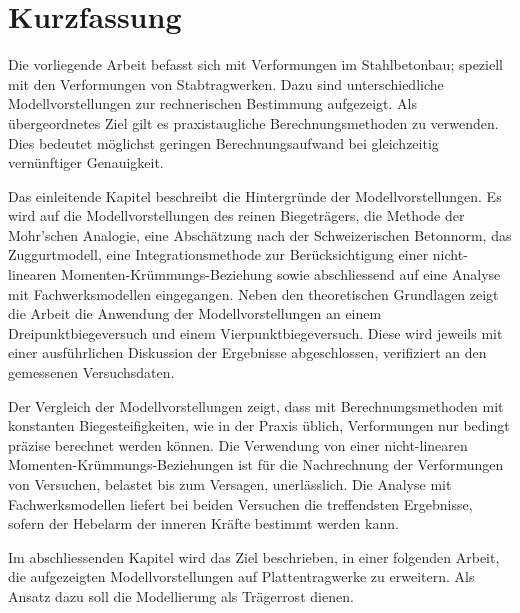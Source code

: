 \chapter*{Kurzfassung}

Die vorliegende Arbeit befasst sich mit Verformungen im Stahlbetonbau; speziell mit den Verformungen von Stabtragwerken. Dazu sind unterschiedliche Modellvorstellungen zur rechnerischen Bestimmung aufgezeigt. Als übergeordnetes Ziel gilt es praxistaugliche Berechnungsmethoden zu verwenden. Dies bedeutet möglichst geringen Berechnungsaufwand bei gleichzeitig vernünftiger Genauigkeit.  

Das einleitende Kapitel beschreibt die Hintergründe der Modellvorstellungen. Es wird auf die Modellvorstellungen des reinen Biegeträgers, die Methode der Mohr'schen Analogie, eine Abschätzung nach der Schweizerischen Betonnorm, das Zuggurtmodell, eine Integrationsmethode zur Berücksichtigung einer nicht-linearen Momenten-Krümmungs-Beziehung sowie abschliessend auf eine Analyse mit Fachwerksmodellen eingegangen. Neben den theoretischen Grundlagen zeigt die Arbeit die Anwendung der Modellvorstellungen an einem Dreipunktbiegeversuch und einem Vierpunktbiegeversuch. Diese wird jeweils mit einer ausführlichen Diskussion der Ergebnisse abgeschlossen, verifiziert an den gemessenen Versuchsdaten. 

Der Vergleich der Modellvorstellungen zeigt, dass mit Berechnungsmethoden mit konstanten Biegesteifigkeiten, wie in der Praxis üblich, Verformungen nur bedingt präzise berechnet werden können. Die Verwendung von einer nicht-linearen Momenten-Krümmungs-Beziehungen ist für die Nachrechnung der Verformungen von Versuchen, belastet bis zum Versagen, unerlässlich. Die Analyse mit Fachwerksmodellen liefert bei beiden Versuchen die treffendsten Ergebnisse, sofern der Hebelarm der inneren Kräfte bestimmt werden kann. 


Im abschliessenden Kapitel wird das Ziel beschrieben, in einer folgenden Arbeit, die aufgezeigten Modellvorstellungen auf Plattentragwerke zu erweitern. Als Ansatz dazu soll die Modellierung als Trägerrost dienen.